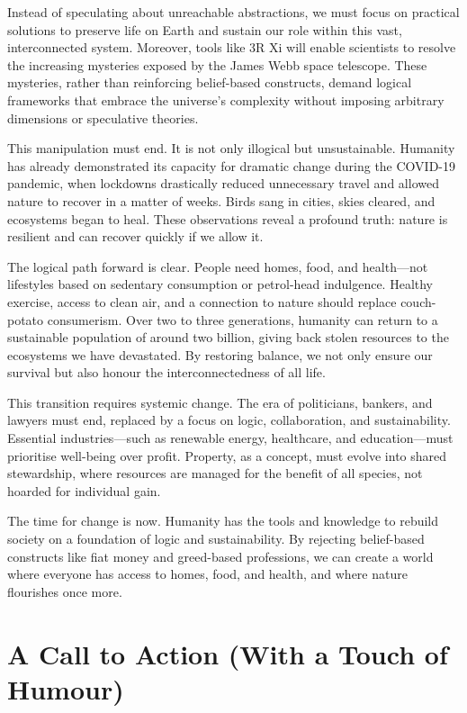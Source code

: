 \documentclass[12pt]{article}
\begin{document}
Instead of speculating about unreachable abstractions, we must focus on practical solutions to preserve life on Earth and sustain our role within this vast, interconnected system. Moreover, tools like 3R Xi will enable scientists to resolve the increasing mysteries exposed by the James Webb space telescope. These mysteries, rather than reinforcing belief-based constructs, demand logical frameworks that embrace the universe's complexity without imposing arbitrary dimensions or speculative theories.

This manipulation must end. It is not only illogical but unsustainable. Humanity has already demonstrated its capacity for dramatic change during the COVID-19 pandemic, when lockdowns drastically reduced unnecessary travel and allowed nature to recover in a matter of weeks. Birds sang in cities, skies cleared, and ecosystems began to heal. These observations reveal a profound truth: nature is resilient and can recover quickly if we allow it.

The logical path forward is clear. People need homes, food, and health—not lifestyles based on sedentary consumption or petrol-head indulgence. Healthy exercise, access to clean air, and a connection to nature should replace couch-potato consumerism. Over two to three generations, humanity can return to a sustainable population of around two billion, giving back stolen resources to the ecosystems we have devastated. By restoring balance, we not only ensure our survival but also honour the interconnectedness of all life.

This transition requires systemic change. The era of politicians, bankers, and lawyers must end, replaced by a focus on logic, collaboration, and sustainability. Essential industries—such as renewable energy, healthcare, and education—must prioritise well-being over profit. Property, as a concept, must evolve into shared stewardship, where resources are managed for the benefit of all species, not hoarded for individual gain.

The time for change is now. Humanity has the tools and knowledge to rebuild society on a foundation of logic and sustainability. By rejecting belief-based constructs like fiat money and greed-based professions, we can create a world where everyone has access to homes, food, and health, and where nature flourishes once more.

\section*{A Call to Action (With a Touch of Humour)}
\end{document}
